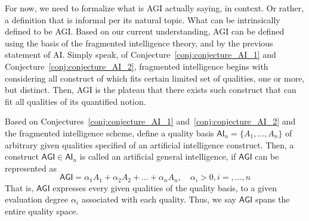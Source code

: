 For now, we need to formalize what is AGI actually saying, in context. Or rather, a definition that is informal per its natural topic. What can be intrinsically defined to be AGI. Based on our current understanding, AGI can be defined using the basis of the fragmented intelligence theory, and by the previous statement of AI. Simply speak, of Conjecture~\ref{conj:conjecture_AI_1} and Conjecture~\ref{conj:conjecture_AI_2}, fragmented intelligence begins with considering all construct of which fits certain limited set of qualities, one or more, but distinct. Then, AGI is the plateau that there exists such construct that can fit all qualities of its quantified notion. 

\begin{definition}
    Based on Conjectures~\ref{conj:conjecture_AI_1} and~\ref{conj:conjecture_AI_2} and the fragmented intelligence scheme, define a quality basis $\mathsf{AI}_{n}=\{A_{1},\dots,A_{n}\}$ of arbitrary given qualities specified of an artificial intelligence construct. Then, a construct $\mathsf{AGI}\in\mathsf{AI}_{n}$ is called an artificial general intelligence, if $\mathsf{AGI}$ can be represented as 
    \begin{equation}
        \mathsf{AGI} = \alpha_{1}A_{1} + \alpha_{2}A_{2} + \dots + \alpha_{n}A_{n}, \quad \alpha_{i} > 0, i = ,\dots, n
    \end{equation}
    That is, $\mathsf{AGI}$ expresses every given qualities of the quality basis, to a given evaluation degree $\alpha_{i}$ associated with each quality. Thus, we say $\mathsf{AGI}$ spans the entire quality space. 
\end{definition}

